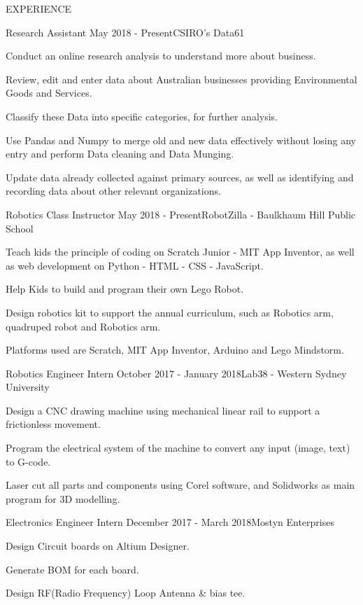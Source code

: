\documentclass{resume} %
\begin{document}
\begin{rSection}{EXPERIENCE}
\begin{rSubsection}{Research Assistant} {May 2018 - Present}{\faInstitution CSIRO's Data61}{}
\item Conduct an online research analysis to understand more about business.
\item Review, edit and enter data about Australian businesses providing Environmental Goods and Services.    
\item Classify these Data into specific categories, for further analysis.
\item Use Pandas and Numpy to merge old and new data effectively without losing any entry and perform Data cleaning and Data Munging.
\item Update data already collected against primary sources, as well as identifying and recording data about other relevant organizations.
\end{rSubsection}

\begin{rSubsection}{Robotics Class Instructor} {May 2018 - Present}{\faInstitution RobotZilla - Baulkhaum Hill Public School}{}
\item  Teach kids the principle of coding on Scratch Junior - MIT App Inventor, as well as web development on Python - HTML - CSS - JavaScript.
\item Help Kids to build and program their own Lego Robot.
\item Design robotics kit to support the annual curriculum, such as Robotics arm, quadruped robot and Robotics arm.
\item Platforms used are Scratch, MIT App Inventor, Arduino and Lego Mindstorm.
\end{rSubsection}

\begin{rSubsection}{Robotics Engineer Intern} {October 2017 - January 2018}{\faInstitution Lab38 - Western Sydney University}{}
\item Design a CNC drawing machine using mechanical linear rail to support a frictionless movement.
\item Program the electrical system of the machine to convert any input (image, text) to G-code.
\item Laser cut all parts and components using Corel software, and Solidworks as main program for 3D modelling.
\end{rSubsection}

\begin{rSubsection}{Electronics Engineer Intern} {December 2017 - March 2018}{\faInstitution Mostyn Enterprises}{}
\item  Design Circuit boards on Altium Designer.
\item Generate BOM for each board.
\item Design RF(Radio Frequency) Loop Antenna \& bias tee.
\end{rSubsection}

\end{rSection}  
\end{document}
